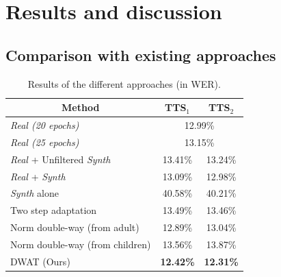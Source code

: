 \section{Results and discussion}
\label{section:exp_DWAT}

\subsection{Comparison with existing approaches}

\begin{table}[t]
\centering
\begin{tabular}{ccc}
\hline
 Method & TTS$_1$ & TTS$_2$  \\ \hline
\multicolumn{1}{l}{\textit{Real (20 epochs)}} & \multicolumn{2}{c}{12.99\%}\\ 
\multicolumn{1}{l}{\textit{Real (25 epochs)}} & \multicolumn{2}{c}{13.15\%}\\ \hline
\multicolumn{1}{l}{\textit{Real} + Unfiltered \textit{Synth}}  &   13.41\%  & 13.24\% \\ 
\multicolumn{1}{l}{\textit{Real} + \textit{Synth} \cite{wang2021towards}} & 13.09\% & 12.98\% \\
\multicolumn{1}{l}{\textit{Synth} alone}    & 40.58\%  & 40.21\%  \\
\multicolumn{1}{l}{Two step adaptation}    & 13.49\%  & 13.46\%  \\
\hline
\multicolumn{1}{l}{Norm double-way (from adult)} & 12.89\% & 13.04\% \\ 
\multicolumn{1}{l}{Norm double-way (from children)} & 13.56\% & 13.87\% \\ \hline
\multicolumn{1}{l}{DWAT (Ours)} &\textbf{ 12.42\%} & \textbf{12.31\%} \\ \hline
\end{tabular}

\caption{Results of the different approaches (in WER).}
\label{tab:res_DWAT}
\end{table}

